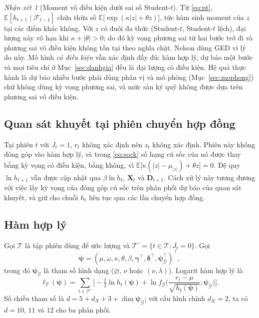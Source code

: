 \documentclass[12pt,a4paper]{article}
\theoremstyle{definition}
\theoremstyle{remark}
\newtheorem{nhanxet}{Nhận xét}[section]
\newcommand{\E}{\mathbb{E}}
\newcommand{\Fcal}{\mathcal{F}}
\newcommand{\Gcal}{\mathcal{G}}
\newcommand{\bpsi}{\boldsymbol{\psi}}
\newcommand{\bgamma}{\boldsymbol{\gamma}}
\newcommand{\bdelta}{\boldsymbol{\delta}}
\newcommand{\bX}{\mathbf{X}}
\newcommand{\bD}{\mathbf{D}}
\begin{document}
\begin{nhanxet}[Moment vô điều kiện dưới sai số Student-$t$]
Từ \eqref{eq:pt}, $\E[h_{t+1}\mid\Fcal_{t-1}]$ chứa thừa số $\E\big[\exp(\kappa|z|+\theta z)\big]$, tức hàm sinh moment của $z$ tại các điểm khác không. Với $z$ có đuôi đa thức (Student-$t$, Student-$t$ lệch), đại lượng này vô hạn khi $\kappa+|\theta|>0$; do đó kỳ vọng phương sai từ hai bước trở đi và phương sai vô điều kiện không tồn tại theo nghĩa chặt. Nelson \cite{nelson1991} dùng GED vì lý do này. Mô hình \emph{có điều kiện} vẫn xác định đầy đủ: hàm hợp lý, dự báo một bước và mọi tiêu chí ở Mục~\ref{sec:danhgia} đều là đại lượng có điều kiện. Hệ quả thực hành là dự báo nhiều bước phải dùng phân vị và mô phỏng (Mục~\ref{sec:mophong}) chứ không dùng kỳ vọng phương sai, và mức sàn ký quỹ không được dựa trên phương sai vô điều kiện.
\end{nhanxet}

\subsection{Quan sát khuyết tại phiên chuyển hợp đồng}\label{sec:khuyet}

Tại phiên $t$ với $J_t=1$, $r_t$ không xác định nên $z_t$ không xác định. Phiên này không đóng góp vào hàm hợp lý, và trong \eqref{eq:sock} số hạng cú sốc của nó được thay bằng kỳ vọng có điều kiện, bằng không, vì $\E\big[\kappa(|z|-\mu_{|z|})+\theta z\big]=0$. Đệ quy $\ln h_{t+1}$ vẫn được cập nhật qua $\beta\ln h_t$, $\bX_t$ và $\bD_{t+1}$. Cách xử lý này tương đương với việc lấy kỳ vọng của đóng góp cú sốc trên phân phối dự báo của quan sát khuyết, và giữ cho chuỗi $h_t$ liên tục qua các lần chuyển hợp đồng.

\subsection{Hàm hợp lý}

Gọi $\mathcal T$ là tập phiên dùng để ước lượng và $\mathcal T^{\circ}=\{t\in\mathcal T: J_t=0\}$. Gọi
\begin{equation*}
\bpsi=(\mu,\omega,\kappa,\theta,\beta,\bgamma^\top,\bdelta^\top,\bpsi_{\Gcal}^\top)^\top,
\end{equation*}
trong đó $\bpsi_{\Gcal}$ là tham số hình dạng ($\varnothing$, $\nu$ hoặc $(\nu,\lambda)$). Logarit hàm hợp lý là
\begin{equation}\label{eq:loglik}
\ell_T(\bpsi)=\sum_{t\in\mathcal T^{\circ}}\Big[-\tfrac12\ln h_t(\bpsi)+\ln f_{\Gcal}\Big(\frac{r_t-\mu}{\sqrt{h_t(\bpsi)}};\bpsi_{\Gcal}\Big)\Big].
\end{equation}
Số chiều tham số là $d=5+d_X+3+\dim\bpsi_{\Gcal}$; với cấu hình chính $d_X=2$, ta có $d=10$, $11$ và $12$ cho ba phân phối.
\end{document}
